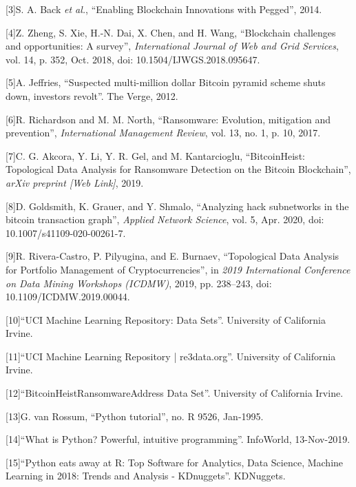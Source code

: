 \documentclass[10pt]{article}
\begin{document}
\label{csl:3}[3]S. A. Back \textit{et al.}, ``{Enabling Blockchain Innovations with Pegged}'', 2014.

\label{csl:4}[4]Z. Zheng, S. Xie, H.-N. Dai, X. Chen, and H. Wang, ``{Blockchain challenges and opportunities: A survey}'', \textit{International Journal of Web and Grid Services}, vol. 14, p. 352, Oct. 2018, doi: 10.1504/IJWGS.2018.095647.

\label{csl:5}[5]A. Jeffries, ``{Suspected multi-million dollar Bitcoin pyramid scheme shuts down, investors revolt}''. The Verge, 2012.

\label{csl:6}[6]R. Richardson and M. M. North, ``{Ransomware: Evolution, mitigation and prevention}'', \textit{International Management Review}, vol. 13, no. 1, p. 10, 2017.

\label{csl:7}[7]C. G. Akcora, Y. Li, Y. R. Gel, and M. Kantarcioglu, ``{BitcoinHeist: Topological Data Analysis for Ransomware Detection on the Bitcoin Blockchain}'', \textit{arXiv preprint [Web Link]}, 2019.

\label{csl:8}[8]D. Goldsmith, K. Grauer, and Y. Shmalo, ``{Analyzing hack subnetworks in the bitcoin transaction graph}'', \textit{Applied Network Science}, vol. 5, Apr. 2020, doi: 10.1007/s41109-020-00261-7.

\label{csl:9}[9]R. {Rivera-Castro}, P. {Pilyugina}, and E. {Burnaev}, ``{Topological Data Analysis for Portfolio Management of Cryptocurrencies}'', in \textit{2019 International Conference on Data Mining Workshops (ICDMW)}, 2019, pp. 238–243, doi: 10.1109/ICDMW.2019.00044.

\label{csl:10}[10]``{UCI Machine Learning Repository: Data Sets}''. University of California Irvine.

\label{csl:11}[11]``{UCI Machine Learning Repository | re3data.org}''. University of California Irvine.

\label{csl:12}[12]``{BitcoinHeistRansomwareAddress Data Set}''. University of California Irvine.

\label{csl:13}[13]G. van Rossum, ``{Python tutorial}'', no. R 9526, Jan-1995.

\label{csl:14}[14]``{What is Python? Powerful, intuitive programming}''. InfoWorld, 13-Nov-2019.

\label{csl:15}[15]``{Python eats away at R: Top Software for Analytics, Data Science, Machine Learning in 2018: Trends and Analysis - KDnuggets}''. KDNuggets.
\end{document}

